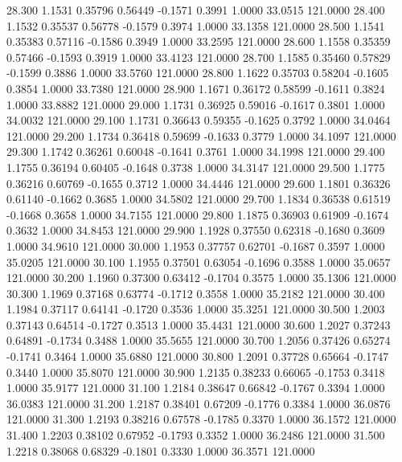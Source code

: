   28.300   1.1531   0.35796   0.56449  -0.1571   0.3991   1.0000  33.0515 121.0000
  28.400   1.1532   0.35537   0.56778  -0.1579   0.3974   1.0000  33.1358 121.0000
  28.500   1.1541   0.35383   0.57116  -0.1586   0.3949   1.0000  33.2595 121.0000
  28.600   1.1558   0.35359   0.57466  -0.1593   0.3919   1.0000  33.4123 121.0000
  28.700   1.1585   0.35460   0.57829  -0.1599   0.3886   1.0000  33.5760 121.0000
  28.800   1.1622   0.35703   0.58204  -0.1605   0.3854   1.0000  33.7380 121.0000
  28.900   1.1671   0.36172   0.58599  -0.1611   0.3824   1.0000  33.8882 121.0000
  29.000   1.1731   0.36925   0.59016  -0.1617   0.3801   1.0000  34.0032 121.0000
  29.100   1.1731   0.36643   0.59355  -0.1625   0.3792   1.0000  34.0464 121.0000
  29.200   1.1734   0.36418   0.59699  -0.1633   0.3779   1.0000  34.1097 121.0000
  29.300   1.1742   0.36261   0.60048  -0.1641   0.3761   1.0000  34.1998 121.0000
  29.400   1.1755   0.36194   0.60405  -0.1648   0.3738   1.0000  34.3147 121.0000
  29.500   1.1775   0.36216   0.60769  -0.1655   0.3712   1.0000  34.4446 121.0000
  29.600   1.1801   0.36326   0.61140  -0.1662   0.3685   1.0000  34.5802 121.0000
  29.700   1.1834   0.36538   0.61519  -0.1668   0.3658   1.0000  34.7155 121.0000
  29.800   1.1875   0.36903   0.61909  -0.1674   0.3632   1.0000  34.8453 121.0000
  29.900   1.1928   0.37550   0.62318  -0.1680   0.3609   1.0000  34.9610 121.0000
  30.000   1.1953   0.37757   0.62701  -0.1687   0.3597   1.0000  35.0205 121.0000
  30.100   1.1955   0.37501   0.63054  -0.1696   0.3588   1.0000  35.0657 121.0000
  30.200   1.1960   0.37300   0.63412  -0.1704   0.3575   1.0000  35.1306 121.0000
  30.300   1.1969   0.37168   0.63774  -0.1712   0.3558   1.0000  35.2182 121.0000
  30.400   1.1984   0.37117   0.64141  -0.1720   0.3536   1.0000  35.3251 121.0000
  30.500   1.2003   0.37143   0.64514  -0.1727   0.3513   1.0000  35.4431 121.0000
  30.600   1.2027   0.37243   0.64891  -0.1734   0.3488   1.0000  35.5655 121.0000
  30.700   1.2056   0.37426   0.65274  -0.1741   0.3464   1.0000  35.6880 121.0000
  30.800   1.2091   0.37728   0.65664  -0.1747   0.3440   1.0000  35.8070 121.0000
  30.900   1.2135   0.38233   0.66065  -0.1753   0.3418   1.0000  35.9177 121.0000
  31.100   1.2184   0.38647   0.66842  -0.1767   0.3394   1.0000  36.0383 121.0000
  31.200   1.2187   0.38401   0.67209  -0.1776   0.3384   1.0000  36.0876 121.0000
  31.300   1.2193   0.38216   0.67578  -0.1785   0.3370   1.0000  36.1572 121.0000
  31.400   1.2203   0.38102   0.67952  -0.1793   0.3352   1.0000  36.2486 121.0000
  31.500   1.2218   0.38068   0.68329  -0.1801   0.3330   1.0000  36.3571 121.0000
